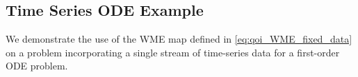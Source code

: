 


\subsection{Time Series ODE Example}\label{subsec:ode-example}

We demonstrate the use of the WME map defined in \eqref{eq:qoi_WME_fixed_data} on a problem incorporating a single stream of time-series data for a first-order ODE problem.

